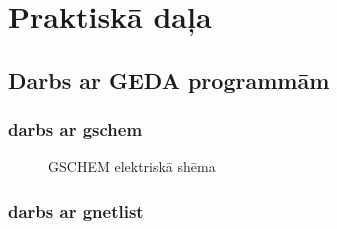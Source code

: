 \documentclass{report}
\begin{document}
\chapter{Praktiskā daļa}
\section {Darbs ar GEDA programmām}
\subsection{darbs ar gschem}

\begin{figure}[h]
\caption{GSCHEM elektriskā shēma}
\label{2}
\end{figure}

\subsection{darbs ar gnetlist}

\end{document}
